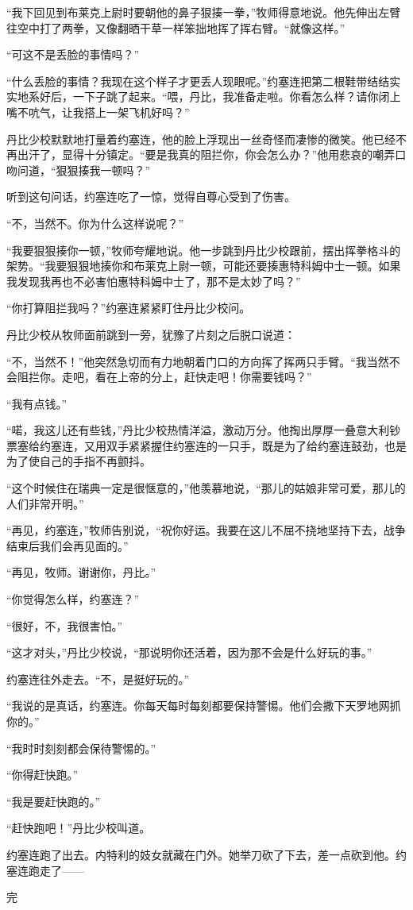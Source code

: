     “我下回见到布莱克上尉时要朝他的鼻子狠揍一拳，”牧师得意地说。他先伸出左臂往空中打了两拳，又像翻晒干草一样笨拙地挥了挥右臂。“就像这样。”

    “可这不是丢脸的事情吗？”

    “什么丢脸的事情？我现在这个样子才更丢人现眼呢。”约塞连把第二根鞋带结结实实地系好后，一下子跳了起来。“喂，丹比，我准备走啦。你看怎么样？请你闭上嘴不吭气，让我搭上一架飞机好吗？”

    丹比少校默默地打量着约塞连，他的脸上浮现出一丝奇怪而凄惨的微笑。他已经不再出汗了，显得十分镇定。“要是我真的阻拦你，你会怎么办？”他用悲哀的嘲弄口吻问道，“狠狠揍我一顿吗？”

    听到这句问话，约塞连吃了一惊，觉得自尊心受到了伤害。

    “不，当然不。你为什么这样说呢？”

    “我要狠狠揍你一顿，”牧师夸耀地说。他一步跳到丹比少校跟前，摆出挥拳格斗的架势。“我要狠狠地揍你和布莱克上尉一顿，可能还要揍惠特科姆中士一顿。如果我发现我再也不必害怕惠特科姆中士了，那不是太妙了吗？”

    “你打算阻拦我吗？”约塞连紧紧盯住丹比少校问。

    丹比少校从牧师面前跳到一旁，犹豫了片刻之后脱口说道：

    “不，当然不！”他突然急切而有力地朝着门口的方向挥了挥两只手臂。“我当然不会阻拦你。走吧，看在上帝的分上，赶快走吧！你需要钱吗？”

    “我有点钱。”

    “喏，我这儿还有些钱，”丹比少校热情洋溢，激动万分。他掏出厚厚一叠意大利钞票塞给约塞连，又用双手紧紧握住约塞连的一只手，既是为了给约塞连鼓劲，也是为了使自己的手指不再颤抖。

    “这个时候住在瑞典一定是很惬意的，”他羡慕地说，“那儿的姑娘非常可爱，那儿的人们非常开明。”

    “再见，约塞连，”牧师告别说，“祝你好运。我要在这儿不屈不挠地坚持下去，战争结束后我们会再见面的。”

    “再见，牧师。谢谢你，丹比。”

    “你觉得怎么样，约塞连？”

    “很好，不，我很害怕。”

    “这才对头，”丹比少校说，“那说明你还活着，因为那不会是什么好玩的事。”

    约塞连往外走去。“不，是挺好玩的。”

    “我说的是真话，约塞连。你每天每时每刻都要保持警惕。他们会撒下天罗地网抓你的。”

    “我时时刻刻都会保待警惕的。”

    “你得赶快跑。”

    “我是要赶快跑的。”

    “赶快跑吧！”丹比少校叫道。

    约塞连跑了出去。内特利的妓女就藏在门外。她举刀砍了下去，差一点砍到他。约塞连跑走了——

    完
